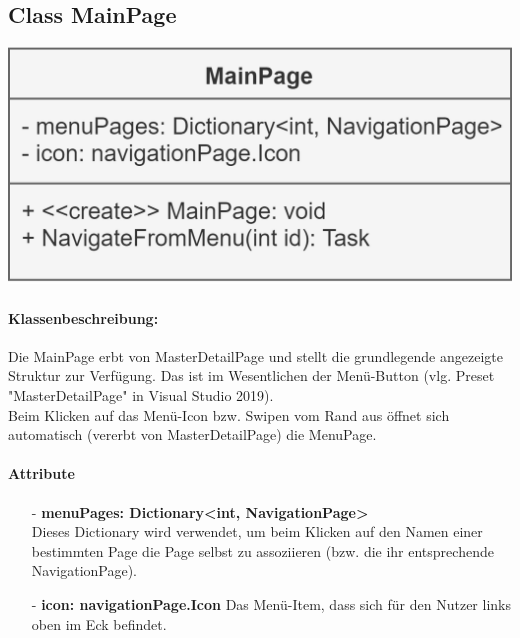 \documentclass[a4paper,12pt]{article}
\begin{document}
		\begin{minipage}[b]{0.7\textwidth}

			\subsection{Class MainPage}
		\end{minipage}
		\begin{minipage}[c]{0.3\textwidth}
			\includegraphics[width=\textwidth]{bilder/ViewKlassen/MainPage.png}
		\end{minipage}
		\paragraph{Klassenbeschreibung:}
		Die MainPage erbt von MasterDetailPage und stellt die grundlegende angezeigte Struktur zur Verfügung. Das ist im Wesentlichen der Menü-Button (vlg. Preset "MasterDetailPage" in Visual Studio 2019).\\
		Beim Klicken auf das Menü-Icon bzw. Swipen vom Rand aus öffnet sich automatisch (vererbt von MasterDetailPage) die MenuPage.
		\paragraph{Attribute}
		\begin{itemize}
			\item [-] \textbf{menuPages: Dictionary<int, NavigationPage>}\\ Dieses Dictionary wird verwendet, um beim Klicken auf den Namen einer bestimmten Page die Page selbst zu assoziieren (bzw. die ihr entsprechende NavigationPage).
			\item [-] \textbf{icon: navigationPage.Icon} Das Menü-Item, dass sich für den Nutzer links oben im Eck befindet.
		\end{itemize}
\end{document}
